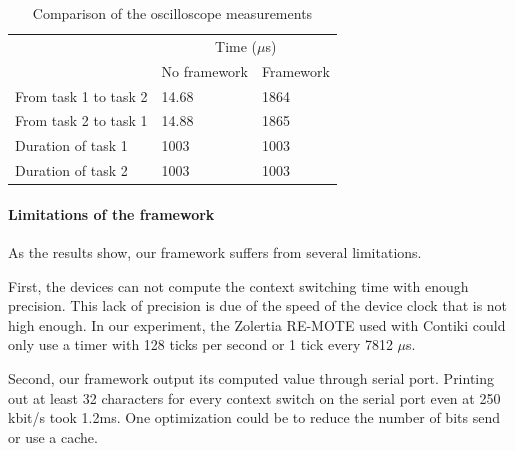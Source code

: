 \begin{table}[!ht]
  \centering
  \begin{tabular}{lll}
                        & \multicolumn{2}{c}{Time ($\mu$s)}                                     \\ \cline{2-3} 
                        & \multicolumn{1}{c}{No framework} & Framework \\ \cline{2-3} 
  From task 1 to task 2 & 14.68                                     & 1864                  \\
  From task 2 to task 1 & 14.88                                     & 1865                  \\
  Duration of task 1    & 1003                                      & 1003                  \\
  Duration of task 2    & 1003                                      & 1003                 
  \end{tabular}
  \caption{Comparison of the oscilloscope measurements}
  \label{tab:measurements-comparison}
\end{table}

\paragraph{Limitations of the framework}

As the results show, our framework suffers from several limitations.

First, the devices can not compute the context switching time with enough precision.
This lack of precision is due of the speed of the device clock that is not high enough.
In our experiment, the Zolertia RE-MOTE used with Contiki could only use a timer with 128 ticks per second or 1 tick every 7812 $\mu$s.

Second, our framework output its computed value through serial port.
Printing out at least 32 characters for every context switch on the serial port even at 250 kbit/s took 1.2ms.
One optimization could be to reduce the number of bits send or use a cache.
